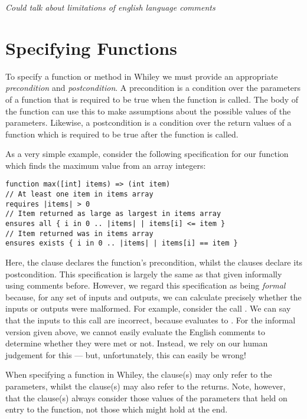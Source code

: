{\em Could talk about limitations of english language comments}

\section{Specifying Functions}
To specify a function or method in Whiley we must provide an appropriate {\em precondition} and {\em postcondition}.  A precondition is a condition over the parameters of a function that is required to be true when the function is called.  The body of the function can use this to make assumptions about the possible values of the parameters.  Likewise, a postcondition is a condition over the return values of a function which is required to be true after the function is called.  

\begin{eg}
As a very simple example, consider the following specification for our function which finds the maximum value from an array integers:
\begin{lstlisting}
function max([int] items) => (int item) 
// At least one item in items array
requires |items| > 0
// Item returned as large as largest in items array
ensures all { i in 0 .. |items| | items[i] <= item }
// Item returned was in items array
ensures exists { i in 0 .. |items| | items[i] == item }
\end{lstlisting}
Here, the  clause declares the function's precondition, whilst the  clauses declare its postcondition.  This specification is largely the same as that given informally using comments before.  However, we regard this specification as being {\em formal} because, for any set of inputs and outputs, we can calculate precisely whether the inputs or outputs were malformed.  For example, consider the call .  We can say that the inputs to this call are incorrect, because  evaluates to .  For the informal version given above, we cannot easily evaluate the English comments to determine whether they were met or not.  Instead, we rely on our human judgement for this --- but, unfortunately, this can easily be wrong!
\end{eg}

When specifying a function in Whiley, the  clause(s) may only refer to the parameters, whilst the  clause(s) may also refer to the returns.  Note, however, that the  clause(s) always consider those values of the parameters that held on entry to the function, not those which might hold at the end.


